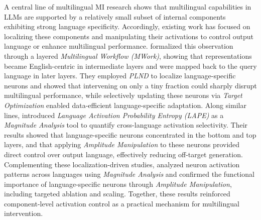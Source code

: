 \documentclass[11pt,letterpaper]{mystyle}
\begin{document}
  A central line of multilingual MI research shows that multilingual capabilities in LLMs are supported by a relatively small subset of internal components exhibiting strong language specificity. Accordingly, existing work has focused on localizing these components and manipulating their activations to control output language or enhance multilingual performance.
  \citet{zhao-etal-2024-multilingual} formalized this observation through a layered \textit{Multilingual Workflow (MWork)}, showing that representations became English-centric in intermediate layers and were mapped back to the query language in later layers. They employed \textit{PLND} to localize language-specific neurons and showed that intervening on only a tiny fraction could sharply disrupt multilingual performance, while selectively updating these neurons via \textit{Target Optimization} enabled data-efficient language-specific adaptation. 
  Along similar lines, \citet{tang-etal-2024-language} introduced \textit{Language Activation Probability Entropy (LAPE)} as a \textit{Magnitude Analysis} tool to quantify cross-language activation selectivity. Their results showed that language-specific neurons concentrated in the bottom and top layers, and that applying \textit{Amplitude Manipulation} to these neurons provided direct control over output language, effectively reducing off-target generation. 
  Complementing these localization-driven studies, \citet{kojima-etal-2024-multilingual} analyzed neuron activation patterns across languages using \textit{Magnitude Analysis} and confirmed the functional importance of language-specific neurons through \textit{Amplitude Manipulation}, including targeted ablation and scaling. Together, these results reinforced component-level activation control as a practical mechanism for multilingual intervention.
  
\end{document}
